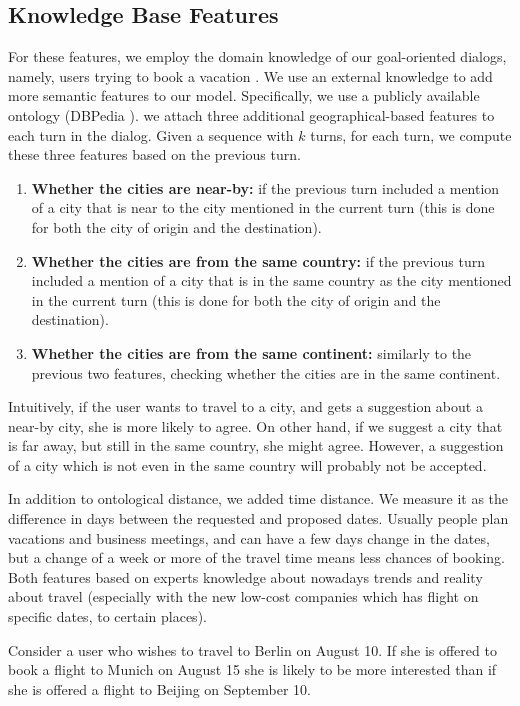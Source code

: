 \subsection{Knowledge Base Features}\label{sec:kb}
For these features, we employ the domain knowledge of our goal-oriented dialogs, 
namely, users trying to book a vacation \cite{frames}. 
We use an external knowledge to add more semantic features to our model. 
Specifically, we use a publicly available ontology (DBPedia \cite{dbpedia}).
we attach three additional geographical-based features to each turn in the dialog. 
Given a sequence with $k$ turns, for each turn, we compute these three features 
based on the previous turn. 

\begin{enumerate}
\item {\bf Whether the cities are near-by: } if the previous turn included a mention of a city that is near to the city mentioned in the current turn (this is done for both the city of origin and the destination).
\item {\bf Whether the cities are from the same country: } if the previous turn included a mention of a city that is in the same country as the city mentioned in the current turn (this is done for both the city of origin and the destination).
\item {\bf Whether the cities are from the same continent: } similarly to the previous two features, checking whether the cities are in the same continent.
\end{enumerate}

Intuitively, if the user wants to travel to a city, 
and gets a suggestion about a near-by city, 
she is more likely to agree. 
On other hand, if we suggest a city that is far away, 
but still in the same country, she might agree. 
However, a suggestion of a city which is not even 
in the same country will probably not be accepted. 

In addition to ontological distance, we added time distance. 
We measure it as the difference in days between the requested and proposed dates. 
Usually people plan vacations and business meetings, and can have a few days change in the dates, 
but a change of a week or more of the travel time means less chances of booking.
Both features based on experts knowledge about nowadays trends and reality about travel (especially with the new low-cost companies which has flight on specific dates, to certain places). 

\begin{example}
Consider a user who wishes to travel to Berlin on August 10. 
If she is offered to book a flight to Munich on August 15 she is 
likely to be more interested than if she is offered a flight to 
Beijing on September 10. 
\end{example}
